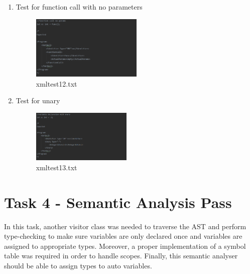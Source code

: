 \documentclass{article}
\begin{document}
\begin{enumerate}
					\item Test for function call with no parameters
					\begin{figure}[H]
					\centering
			 			\includegraphics[width=0.5\textwidth]{xmltest12.png}
			 			 \centering
			  			\caption{xmltest12.txt}
			  			\label{fig:xmltest12}
					\end{figure}
					
					\item Test for unary
					\begin{figure}[H]
					\centering
			 			\includegraphics[width=0.45\textwidth]{xmltest13.png}
			 			\centering
			  			\caption{xmltest13.txt}
			  			\label{fig:xmltest13}
					\end{figure}

					
				\end{enumerate}
			
			
				
					
			
					
										
					

					
					
					
					
					
	

					
					
					
			
			\section{Task 4 - Semantic Analysis Pass}
			
			In this task, another visitor class was needed to traverse the AST and perform type-checking to make sure variables are only declared once and variables are assigned to appropriate types. Moreover, a proper implementation of a symbol table was required in order to handle scopes. Finally, this semantic analyser should be able to assign types to auto variables.
			
\end{document}
